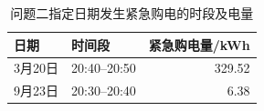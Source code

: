 \begin{table}[!htbp]
\centering
\caption{问题二指定日期发生紧急购电的时段及电量}
\label{tab:q2_emergency_purchase}
\begin{tabular}{llr}
\toprule
日期 & 时间段 & 紧急购电量/kWh \\
\midrule
3月20日 & 20:40--20:50 & 329.52 \\
9月23日 & 20:30--20:40 & 6.38 \\
\bottomrule
\end{tabular}
\end{table}
